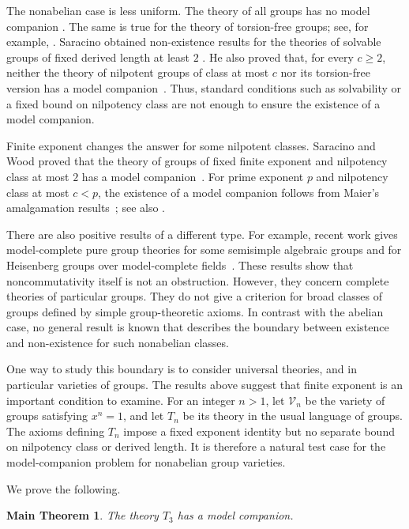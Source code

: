 \documentclass[11pt,reqno]{article}
\newtheorem*{maintheorem*}{Main Theorem}
\theoremstyle{definition}
\theoremstyle{remark}
\begin{document}
The nonabelian case is less uniform. 
The theory of all groups has no model companion \cite[Example~3.5.16]{ChangKeisler1990}.
The same is true for the theory of torsion-free groups; see, for example, \cite{Takeuchi2022}.
Saracino obtained non-existence results for the theories of solvable groups of fixed derived length at least $2$ \cite{Saracino1974}. 
He also proved that, for every $c\geq2$, neither the theory of nilpotent groups of class at most $c$ nor its torsion-free version has a model companion~\cite{Saracino1976}. 
Thus, standard conditions such as solvability or a fixed bound on nilpotency class are not enough to ensure the existence of a model companion.

Finite exponent changes the answer for some nilpotent classes.
Saracino and Wood proved that the theory of groups of fixed finite exponent and nilpotency class at most $2$ has a model companion~\cite{SaracinoWood1979}.
For prime exponent $p$ and nilpotency class at most $c<p$, the existence of a model companion follows from Maier's amalgamation results~\cite{Maier1989}; see also \cite[Corollary~4.42]{dElbeeMuellerRamseySiniora2025}.

There are also positive results of a different type.
For example, recent work gives model-complete pure group theories for some semisimple algebraic groups and for Heisenberg groups over model-complete fields~\cite{HoffmannKowalskiTranYe2023,FracekKowalski2025}.
These results show that noncommutativity itself is not an obstruction.
However, they concern complete theories of particular groups.
They do not give a criterion for broad classes of groups defined by simple group-theoretic axioms.
In contrast with the abelian case, no general result is known that describes the boundary between existence and non-existence for such nonabelian classes.

One way to study this boundary is to consider universal theories, and in particular varieties of groups.
The results above suggest that finite exponent is an important condition to examine.
For an integer $n>1$, let $\mathcal V_n$ be the variety of groups satisfying $x^n=1$, and let $T_n$ be its theory in the usual language of groups.
The axioms defining $T_n$ impose a fixed exponent identity but no separate bound on nilpotency class or derived length.
It is therefore a natural test case for the model-companion problem for nonabelian group varieties.

We prove the following.

\begin{maintheorem*}
The theory $T_3$ has a model companion.
\end{maintheorem*}
\end{document}

